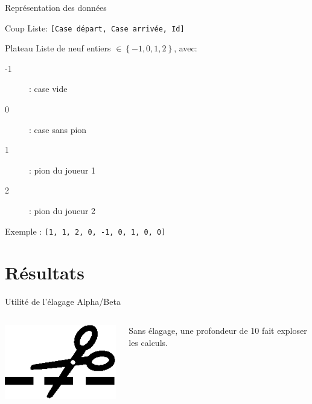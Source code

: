 \documentclass[compress, 12pt]{beamer}
\begin{document}
\begin{frame}{Représentation des données}
\vspace{-.65cm}
    \begin{block}{Coup}
          Liste: \texttt{[Case départ, Case arrivée, Id]}
    \end{block}
    \begin{block}{Plateau}
        Liste de neuf entiers $\in \left\{-1, 0, 1, 2\right\}$, avec:
        \begin{description}
	        \item [-1] : case vide
	        \item [0] : case sans pion
	        \item [1] : pion du joueur 1
	        \item [2] : pion du joueur 2
        \end{description}
        Exemple : \texttt{[1, 1, 2, 0, -1, 0, 1, 0, 0]}
    \end{block}
\end{frame}

\section{Résultats}

\begin{frame}{Utilité de l'élagage Alpha/Beta}
    \begin{columns}
        \begin{column}{.2\textwidth}
            \includegraphics[width=1.3\textwidth]{./pix/sym_cut}
        \end{column}
        \begin{column}{.6\textwidth}
            \begin{center}
                Sans élagage, une profondeur de 10 fait exploser les calculs.
            \end{center}
        \end{column}
    \end{columns}
\end{frame}
\end{document}

